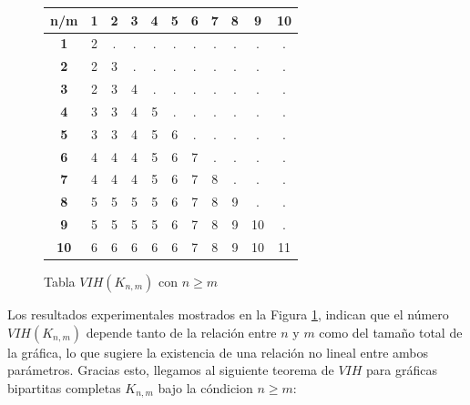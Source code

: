 \documentclass[12pt,titlepage,twoside,openright]{book}
\begin{document}
\begin{figure}[h]
    \centering
    \begin{tabular}{|c|cccccccccc|}
        \hline
        \textbf{n/m} & \textbf{1} & \textbf{2} & \textbf{3} & \textbf{4} & \textbf{5} & \textbf{6} & \textbf{7} & \textbf{8} & \textbf{9} & \textbf{10} \\
        \hline
        \textbf{1} & 2 & . & . & . & . & . & . & . & . & . \\
        \textbf{2} & 2 & 3 & . & . & . & . & . & . & . & . \\
        \textbf{3} & 2 & 3 & 4 & . & . & . & . & . & . & . \\
        \textbf{4} & 3 & 3 & 4 & 5 & . & . & . & . & . & . \\
        \textbf{5} & 3 & 3 & 4 & 5 & 6 & . & . & . & . & . \\
        \textbf{6} & 4 & 4 & 4 & 5 & 6 & 7 & . & . & . & . \\
        \textbf{7} & 4 & 4 & 4 & 5 & 6 & 7 & 8 & . & . & . \\
        \textbf{8} & 5 & 5 & 5 & 5 & 6 & 7 & 8 & 9 & . & . \\
        \textbf{9} & 5 & 5 & 5 & 5 & 6 & 7 & 8 & 9 & 10 & . \\
        \textbf{10} & 6 & 6 & 6 & 6 & 6 & 7 & 8 & 9 & 10 & 11 \\
        \hline
    \end{tabular}
    \caption{Tabla $VIH(K_{n,m})$ con $n\geq m$}
    \label{tabla:VIH(K_n,m)n>=m}
\end{figure}
Los resultados experimentales mostrados en la Figura \ref{tabla:VIH(K_n,m)n>=m}, indican que el n\'umero $VIH(K_{n,m})$ depende tanto de la relaci\'on entre $n$ y $m$ como del tama\~no total de la gr\'afica, lo que sugiere la existencia de una relaci\'on no lineal entre ambos par\'ametros. Gracias esto, llegamos al siguiente teorema de $VIH$ para gr\'aficas bipartitas completas $K_{n,m}$ bajo la c\'ondicion $n\geq m$: 
\end{document}
